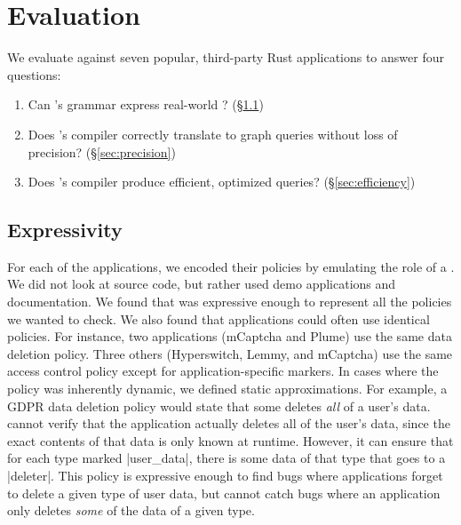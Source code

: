 \section{Evaluation}

We evaluate \syslang{} against seven popular, third-party Rust applications to answer four questions:
%
\begin{enumerate}[nosep]
    \item Can \syslang's grammar express real-world \policies? (\S\ref{sec:expressivity})
    \item Does \syslang's compiler correctly translate \policies to graph queries without loss of precision? (\S\ref{sec:precision})
    \item Does \syslang's compiler produce efficient, optimized queries? (\S\ref{sec:efficiency})
\end{enumerate}
%

\subsection{Expressivity}
\label{sec:expressivity}

For each of the applications, we encoded their \syslang{} policies by
emulating the role of a \ce{}.
%
We did not look at source code, but rather used demo applications and documentation.
%
We found that \syslang{} was expressive enough to represent all the policies we wanted to check.
%
We also found that applications could often use identical policies.
%
For instance, two applications (mCaptcha and Plume) use the same data deletion policy.
%
Three others (Hyperswitch, Lemmy, and mCaptcha) use the same access control policy
except for application-specific markers.
%
In cases where the policy was inherently dynamic, we defined static approximations.
%
For example, a GDPR data deletion policy would state that some \controller{} deletes \emph{all} of a user's data.
%
\sys{} cannot verify that the application actually deletes all of the user's data,
since the exact contents of that data is only known at runtime.
%
However, it can ensure that for each type marked |user_data|, 
there is some data of that type that goes to a |deleter|.
%
This policy is expressive enough to find bugs where applications forget to delete a given type of user data,
but cannot catch bugs where an application only deletes \emph{some} of the data of a given type.
%

